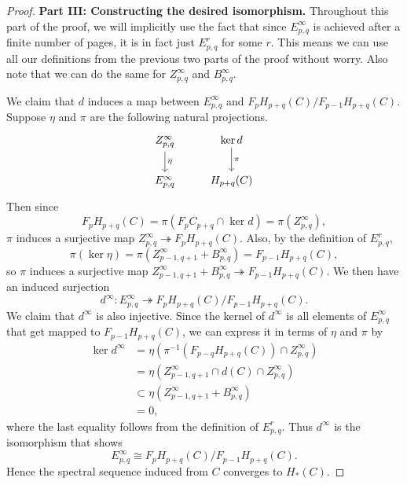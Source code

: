 \documentclass[twoside,10pt]{article}
\begin{document}
\begin{proof}
\textbf{Part III: Constructing the desired isomorphism.} Throughout this part of the proof, we will implicitly use the fact that since $E_{p,q}^{\infty}$ is achieved after a finite number of pages, it is in fact just $E_{p,q}^{r}$ for some $r$. This means we can use all our definitions from the previous two parts of the proof without worry. Also note that we can do the same for $Z_{p,q}^{\infty}$ and $B_{p,q}^{\infty}$.

We claim that $d$ induces a map between $E^{\infty}_{p,q}$ and $F_{p}H_{p+q}(C)/F_{p-1}H_{p+q}(C)$. Suppose $\eta$ and $\pi$ are the following natural projections.
\[
	\begin{tikzcd}
		Z^{\infty}_{p,q}\dar{\eta}&\ker d\dar{\pi}\\
		E^{\infty}_{p,q}&H_{p+q}(C)
	\end{tikzcd}
\] Then since
\[
	F_{p}H_{p+q}(C) = \pi(F_{p}C_{p+q}\cap \ker d)=\pi(Z^{\infty}_{p,q}),
\] 
$\pi$ induces a surjective map $Z^{\infty}_{p,q}\twoheadrightarrow F_{p}H_{p+q}(C)$. Also, by the definition of $E_{p,q}^{r}$,
\[
	\pi(\ker \eta) = \pi(Z^{\infty}_{p-1,q+1}+B^{\infty}_{p,q}) = F_{p-1}H_{p+q}(C),
\] so $\pi$ induces a surjective map $Z^{\infty}_{p-1,q+1}+B^{\infty}_{p,q} \twoheadrightarrow F_{p-1}H_{p+q}(C)$. We then have an induced surjection
\[
	d^{\infty} : E_{p,q}^{\infty} \twoheadrightarrow F_{p}H_{p+q}(C) / F_{p-1}H_{p+q}(C).
\] We claim that $d^{\infty}$ is also injective. Since the kernel of $d^{\infty}$ is all elements of $E_{p,q}^{\infty}$ that get mapped to $F_{p-1}H_{p+q}(C)$, we can express it in terms of $\eta$ and $\pi$ by
\begin{align*}
	\ker d^{\infty} &= \eta\left( \pi^{-1}\left( F_{p-q}H_{p+q}(C) \right) \cap Z_{p,q}^{\infty} \right)\\
			&= \eta\left( Z^{\infty}_{p-1,q+1} \cap d(C) \cap Z_{p,q}^{\infty} \right) \\
			&\subset \eta\left( Z^{\infty}_{p-1,q+1} + B_{p,q}^{\infty} \right) \\
			&= 0,
\end{align*}
where the last equality follows from the definition of $E_{p,q}^{r}$. Thus $d^{\infty}$ is the isomorphism that shows
\[
	E_{p,q}^{\infty} \cong F_{p}H_{p+q}(C) / F_{p-1}H_{p+q}(C).
\] 
Hence the spectral sequence induced from $C$ converges to $H_{*}(C)$.
\end{proof}

\vspace{10mm}
\end{document}
